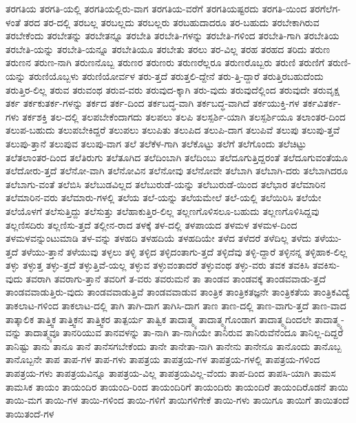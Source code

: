 {ತರಗತಿಯ
ತರಗತಿ-ಯಲ್ಲಿ
ತರಗತಿಯಲ್ಲಿರು-ವಾಗ
ತರಗತಿಯ-ವರೆಗೆ
ತರಗತಿಯಷ್ಟರದು
ತರಗತಿ-ಯಿಂದ
ತರಗೆಲೆಗ-ಳಂತೆ
ತರದ
ತರ-ದಲ್ಲಿ
ತರಬಲ್ಲ
ತರಬಲ್ಲದು
ತರಬಲ್ಲರು
ತರಬಹುದಾದರೂ
ತರ-ಬಹುದು
ತರಬೇಕಾಗಿರುವ
ತರಬೇಕೆಂದು
ತರಬೇತನ್ನು
ತರಬೇತನ್ನೂ
ತರಬೇತಿ
ತರಬೇತಿ-ಗಳನ್ನು
ತರಬೇತಿ-ಗಳಿಂದ
ತರಬೇತಿ-ಗಾಗಿ
ತರಬೇತಿಯ
ತರಬೇತಿ-ಯನ್ನು
ತರಬೇತಿ-ಯನ್ನೂ
ತರಬೇತಿಯೂ
ತರಬೇತು
ತರಲು
ತರ-ವಿಲ್ಲ
ತರಹ
ತರಹದ
ತರಿದು
ತರುಣ
ತರುಣನ
ತರುಣ-ನಾಗಿ
ತರುಣನೊಬ್ಬ
ತರುಣರ
ತರುಣರು
ತರುಣರೆಲ್ಲರೂ
ತರುಣರೊಬ್ಬರು
ತರುಣಿ
ತರುಣಿಗೆ
ತರುಣಿ-ಯನ್ನು
ತರುಣಿಯೊಬ್ಬಳು
ತರುಣಿಯೋರ್ವಳ
ತರು-ತ್ತದೆ
ತರುತ್ತಲಿ-ದ್ದೇನೆ
ತರು-ತ್ತಿ-ದ್ದಾರೆ
ತರುತ್ತಿರಬಹುದೆಂದು
ತರುತ್ತಿರ-ಲಿಲ್ಲ
ತರುವ
ತರುವಂಥ
ತರುವ-ವರು
ತರುವುದ-ಕ್ಕಾಗಿ
ತರು-ವುದು
ತರುವುದೆಲ್ಲಿಂದ
ತರುವುದೇ
ತರುವೃಕ್ಷ
ತರ್ಕ
ತರ್ಕಕುತರ್ಕ-ಗಳನ್ನು
ತರ್ಕದ
ತರ್ಕ-ದಿಂದ
ತರ್ಕಬದ್ಧ-ವಾಗಿ
ತರ್ಕಬದ್ಧ-ವಾಗಿದೆ
ತರ್ಕಯುಕ್ತಿ-ಗಳ
ತರ್ಕವಿತರ್ಕ-ಗಳು
ತರ್ಕಶಕ್ತಿ
ತಲ-ದಲ್ಲಿ
ತಲಪಬೇಕೆಂದಾಗದು
ತಲಪಲು
ತಲಪಿ
ತಲಸ್ಪರ್ಶಿ-ಯಾಗಿ
ತಲಸ್ಪರ್ಶಿಯೂ
ತಲಾಂತರ-ದಿಂದ
ತಲುಪ-ಬಹುದು
ತಲುಪಬೇಕಿದ್ದರೆ
ತಲುಪಲು
ತಲುಪಿತು
ತಲುಪಿದ
ತಲುಪಿ-ದಾಗ
ತಲುಪಿವೆ
ತಲುಪು
ತಲುಪು-ತ್ತವೆ
ತಲುಪು-ತ್ತಾನೆ
ತಲುಪುವ
ತಲುಪು-ವಾಗ
ತಲೆ
ತಲೆಕೆಳ-ಗಾಗಿ
ತಲೆಕೊಟ್ಟು
ತಲೆಗೆ
ತಲೆಗೊಂದು
ತಲೆಚಿಟ್ಟು
ತಲೆತಲಾಂತರ-ದಿಂದ
ತಲೆತಿರುಗು
ತಲೆತೂಗಿದ
ತಲೆದಿಂಬಾಗಿ
ತಲೆದಿಂಬು
ತಲೆದೂಗುತ್ತಿದ್ದರಂತೆ
ತಲೆದೂಗುವಂತೆಯೂ
ತಲೆದೋರು-ತ್ತದೆ
ತಲೆನೋ-ವಾಗಿ
ತಲೆನೋವಿನ
ತಲೆನೋವು
ತಲೆನೋವೇ
ತಲೆಬಾಗಿ
ತಲೆಬಾಗಿ-ದರು
ತಲೆಬಾಗಿದರೂ
ತಲೆಬಾಗು-ವಂತೆ
ತಲೆಬಿಸಿ
ತಲೆಬುಡವಿಲ್ಲದ
ತಲೆಬುರುಡೆ-ಯನ್ನು
ತಲೆಬುರುಡೆ-ಯಿಂದ
ತಲೆಭಾರ
ತಲೆಮಾರಿನ
ತಲೆಮಾರಿನ-ವರು
ತಲೆಮಾರು-ಗಳಲ್ಲಿ
ತಲೆಯ
ತಲೆ-ಯನ್ನು
ತಲೆಯಮೇಲೆ
ತಲೆ-ಯಲ್ಲಿ
ತಲೆಯಿರಿಸಿ
ತಲೆಯೇ
ತಲೆಯೊಳಗೆ
ತಲೆಸುತ್ತಿದ್ದು
ತಲೆಸುತ್ತು
ತಲೆಹಾಕುತ್ತಿರ-ಲಿಲ್ಲ
ತಲ್ಲಣಗೊಳಿಸಲೂ-ಬಹುದು
ತಲ್ಲಣಗೊಳಿಸಿದ್ದವು
ತಲ್ಲಣಿಸದಿರು
ತಲ್ಲಣಿಸು-ತ್ತದೆ
ತಲ್ಲೀನ-ರಾದ
ತಳಕ್ಕೆ
ತಳ-ದಲ್ಲಿ
ತಳಪಾಯದ
ತಳಮಳ
ತಳಮಳ-ದಿಂದ
ತಳಮಳವನ್ನುಂಟುಮಾಡಿ
ತಳ-ವನ್ನು
ತಳಹದಿ
ತಳಹದಿಯೆ
ತಳಹದಿಯೇ
ತಳೆದ
ತಳೆದರೆ
ತಳೆದಿಲ್ಲ
ತಳೆದು
ತಳೆಯು-ತ್ತದೆ
ತಳೆಯು-ತ್ತಾನೆ
ತಳೆಯುವು
ತಳ್ಳಲು
ತಳ್ಳಿ
ತಳ್ಳಿದ
ತಳ್ಳಿದಂತಾಗು-ತ್ತದೆ
ತಳ್ಳಿದೆವು
ತಳ್ಳಿ-ದ್ದಾರೆ
ತಳ್ಳಿನನ್ನ
ತಳ್ಳಿಹಾಕ-ಲಿಲ್ಲ
ತಳ್ಳು
ತಳ್ಳುತ್ತ
ತಳ್ಳು-ತ್ತದೆ
ತಳ್ಳುತ್ತಿವೆ-ಯಲ್ಲ
ತಳ್ಳುವ
ತಳ್ಳುವಂತಾದರೆ
ತಳ್ಳುವಂಥ
ತಳ್ಳು-ವರು
ತವಕ
ತವಕಿಸಿ
ತವಕಿಸು-ವುದು
ತವರಾಗಿ
ತವರಾಗು-ತ್ತಾನೆ
ತವರಿಗೆ
ತ-ವರು
ತವರುಮನೆ
ತಾ
ತಾಂಡವ
ತಾಂಡವಕ್ಕೆ
ತಾಂಡವವಾಡು-ತ್ತದೆ
ತಾಂಡವವಾಡುತ್ತಿರು-ವುದು
ತಾಂಡವವಾಡುತ್ತಿವೆ
ತಾಂಡವವಾಡುವ
ತಾಂತ್ರಿಕ
ತಾಂತ್ರಿಕತಜ್ಞನೇ
ತಾಂತ್ರಿಕತೆಯ
ತಾಂತ್ರಿಕವಿದ್ಯೆ
ತಾಕಲಾಟ-ಗಳಿಂದ
ತಾಕಲಾಟ-ದಲ್ಲಿ
ತಾಗಿ
ತಾಗಿ-ದಾಗ
ತಾಗಿಸಿ-ದಾಗ
ತಾಣ
ತಾಣ-ದಲ್ಲಿ
ತಾಣ-ವಾಗು-ತ್ತದೆ
ತಾಣ-ವಾದ
ತಾತ್ಕಾಲಿಕ
ತಾತ್ತ್ವಿಕ
ತಾತ್ತ್ವಿಕನ
ತಾತ್ತ್ವಿಕರ
ತಾತ್ಪರ್ಯ
ತಾತ್ವಿಕ
ತಾದಾತ್ಮ್ಯ
ತಾದಾತ್ಮ್ಯಗೊಂಡಾಗ
ತಾದಾತ್ಮ್ಯದಿಂದಲೇ
ತಾದಾತ್ಮ್ಯ-ವನ್ನು
ತಾದಾತ್ಮ್ಯವೂ
ತಾನರಿಯುವ
ತಾನವಳನ್ನು
ತಾ-ನಾಗಿ
ತಾ-ನಾಗಿಯೇ
ತಾನಿರುವ
ತಾನಿರುವೆನೆಂದೂ
ತಾನಿಲ್ಲ-ದಿದ್ದರೆ
ತಾನಿಷ್ಟು
ತಾನು
ತಾನೂ
ತಾನೆ
ತಾನೆಸಗಬೇಕೆಂದು
ತಾನೇ
ತಾನೇತಾ-ನಾಗಿ
ತಾನೇನು
ತಾನೇನೂ
ತಾನೊಂದು
ತಾನೊಬ್ಬ
ತಾನೊಬ್ಬನೇ
ತಾಪ
ತಾಪ-ಗಳ
ತಾಪ-ಗಳು
ತಾಪತ್ರಯ
ತಾಪತ್ರಯ-ಗಳ
ತಾಪತ್ರಯ-ಗಳಲ್ಲಿ
ತಾಪತ್ರಯ-ಗಳಿಂದ
ತಾಪತ್ರಯ-ಗಳು
ತಾಪತ್ರಯವಿನ್ನೂ
ತಾಪತ್ರಯ-ವಿಲ್ಲ
ತಾಪತ್ರಯವಿಲ್ಲ-ವೆಂದು
ತಾಪ-ದಿಂದ
ತಾಪಸಿ-ಯಾಗಿ
ತಾಮಸ
ತಾಮಸಿಕ
ತಾಯಂ
ತಾಯಂದಿರ
ತಾಯಂದಿ-ರಿಂದ
ತಾಯಂದಿರಿಗೆ
ತಾಯಂದಿರು
ತಾಯಂದಿರೆ
ತಾಯಂದಿರೊಡನೆ
ತಾಯಿ
ತಾಯಿ-ಮಗ
ತಾಯಿ-ಗಳ
ತಾಯಿ-ಗಳಿಂದ
ತಾಯಿ-ಗಳಿಗೆ
ತಾಯಿಗಳಿಗೇಕೆ
ತಾಯಿ-ಗಳು
ತಾಯಿಗೂ
ತಾಯಿಗೆ
ತಾಯಿತಂದೆ
ತಾಯಿತಂದೆ-ಗಳ
}
